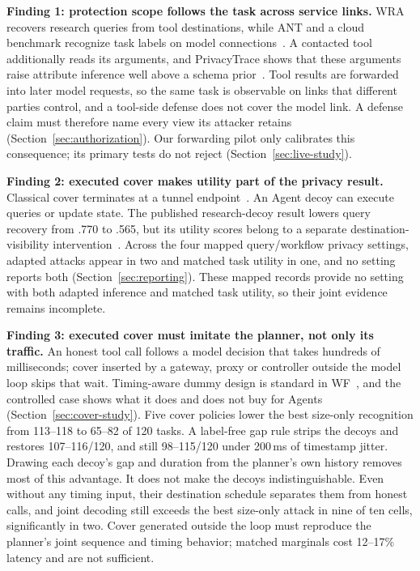 \textbf{Finding 1: protection scope follows the task across service links.} WRA recovers research queries from tool destinations, while ANT and a cloud benchmark recognize task labels on model connections~\cite{jeong2026wra,li2026ant,pouryousef2026traffic}. A contacted tool additionally reads its arguments, and PrivacyTrace shows that these arguments raise attribute inference well above a schema prior~\cite{duan2026privacytrace}. Tool results are forwarded into later model requests, so the same task is observable on links that different parties control, and a tool-side defense does not cover the model link. A defense claim must therefore name every view its attacker retains (Section~\ref{sec:authorization}). Our forwarding pilot only calibrates this consequence; its primary tests do not reject (Section~\ref{sec:live-study}).

\textbf{Finding 2: executed cover makes utility part of the privacy result.} Classical cover terminates at a tunnel endpoint~\cite{apthorpe2019stp}. An Agent decoy can execute queries or update state. The published research-decoy result lowers query recovery from .770 to .565, but its utility scores belong to a separate destination-visibility intervention~\cite{jeong2026wra}. Across the four mapped query/workflow privacy settings, adapted attacks appear in two and matched task utility in one, and no setting reports both (Section~\ref{sec:reporting}). These mapped records provide no setting with both adapted inference and matched task utility, so their joint evidence remains incomplete.

\textbf{Finding 3: executed cover must imitate the planner, not only its traffic.} An honest tool call follows a model decision that takes hundreds of milliseconds; cover inserted by a gateway, proxy or controller outside the model loop skips that wait. Timing-aware dummy design is standard in WF~\cite{shmatikov2006adaptive,juarez2016wtfpad,gong2020front}, and the controlled case shows what it does and does not buy for Agents (Section~\ref{sec:cover-study}). Five cover policies lower the best size-only recognition from 113--118 to 65--82 of 120 tasks. A label-free gap rule strips the decoys and restores 107--116/120, and still 98--115/120 under 200\,ms of timestamp jitter. Drawing each decoy's gap and duration from the planner's own history removes most of this advantage. It does not make the decoys indistinguishable. Even without any timing input, their destination schedule separates them from honest calls, and joint decoding still exceeds the best size-only attack in nine of ten cells, significantly in two. Cover generated outside the loop must reproduce the planner's joint sequence and timing behavior; matched marginals cost 12--17\% latency and are not sufficient.

